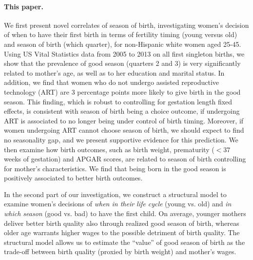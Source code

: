 \documentclass[a4paper, 12 pt]{article}
\theoremstyle{plain}
\begin{document}
\begin{doublespace}
\paragraph{This paper.} We first present novel correlates of season of birth, investigating women's decision of when to have their first birth in terms of fertility timing (young versus old) and season of birth (which quarter), for non-Hispanic white women aged 25-45. Using US Vital Statistics data from 2005 to 2013 on all first singleton births, we show that the prevalence of good season (quarters 2 and 3) is very significantly related to mother's age, as well as to her education and marital status. In addition, we find that women who do not undergo assisted reproductive technology (ART) are 3 percentage points more likely to give birth in the good season. This finding, which is robust to controlling for gestation length fixed effects, is consistent with season of birth being a choice outcome, if undergoing ART is associated to no longer being under control of birth timing. Moreover, if women undergoing ART cannot choose season of birth, we should expect to find no seasonality gap, and we present supportive evidence for this prediction. We then examine how birth outcomes, such as birth weight, prematurity ($<37$ weeks of gestation) and APGAR scores, are related to season of birth controlling for mother's characteristics. We find that being born in the good season is positively associated to better birth outcomes.

In the second part of our investigation, we construct a structural model to examine women's decisions of \emph{when in their life cycle} (young vs. old) and \emph{in which season} (good vs. bad) to have the first child. On average, younger mothers deliver better birth quality also through realized good season of birth, whereas older age warrants higher wages to the possible detriment of birth quality. The structural model allows us to estimate the ``value'' of good season of birth as the trade-off between birth quality (proxied by birth weight) and mother's wages.



\end{doublespace}
\end{document}

